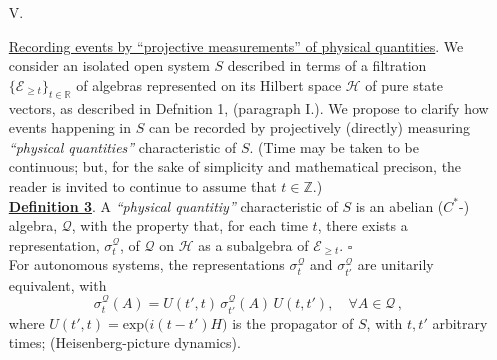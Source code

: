 \documentclass[a4paper,11pt]{article}
\begin{document}
\begin{enumerate}
\item[V.]{\underline{Recording events by ``projective measurements'' of physical quantities}. We consider an isolated open system $S$ described in terms of a filtration $\lbrace \mathcal{E}_{\geq t} \rbrace_{t \in \mathbb{R}}$ of algebras represented on its Hilbert space $\mathcal{H}$ of pure state vectors, as described in Defnition 1, (paragraph I.). We propose to clarify how events happening in $S$ can be recorded by projectively (directly) measuring \textit{``physical quantities''} characteristic of $S$. (Time may be taken to be continuous; but, for the sake of simplicity and mathematical precison, the reader is invited to continue to assume that $t \in \mathbb{Z}$.) \\

\underline{\bf{Definition 3}}. A \textit{``physical quantitiy''} characteristic of $S$ is an abelian ($C^{*}$-) algebra, $\mathcal{Q}$, with the property that, for each time $t$, there exists a representation, $\sigma_{t}^{\mathcal{Q}}$, of $\mathcal{Q}$ on $\mathcal{H}$ as a subalgebra of $\mathcal{E}_{\geq t}$. \hspace{3.5cm} $\square$\\

For autonomous systems, the representations $\sigma_{t}^{\mathcal{Q}}$ and $\sigma_{t'}^{\mathcal{Q}}$ are unitarily equivalent, with
$$\sigma_{t}^{\mathcal{Q}}(A) = U(t',t)\,\sigma_{t'}^{\mathcal{Q}}(A)\, U(t,t'), \quad \forall A \in \mathcal{Q}\,,$$
where $U(t',t)= \text{exp}\big(i(t-t')H\big)$ is the propagator of $S$, with $t,t'$ arbitrary times; (Heisenberg-picture dynamics).


}
\end{enumerate}
\end{document}
